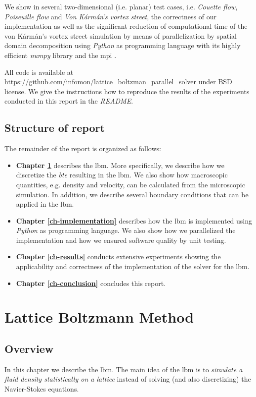 \documentclass[a4paper,11pt, footsepline]{book}
\begin{document}
We show in several two-dimensional (i.e. planar) test cases, i.e. \textit{Couette flow}, \textit{Poiseuille flow} and \textit{Von K\'{a}rm\'{a}n's vortex street}, the correctness of our implementation as well as the significant reduction of computational time of the von K\'{a}rm\'{a}n's vortex street simulation by means of parallelization by spatial domain decomposition using \textit{Python} as programming language with its highly efficient \textit{numpy} library \cite{Oliphant.2006,vanderWalt.2011} and the \acf{mpi} \cite{Dalcin.2005, Dalcin.2008, Dalcin.2011}.

All code is available at \url{https://github.com/infomon/lattice_boltzman_parallel_solver} under BSD license. We give the instructions how to reproduce the results of the experiments conducted in this report in the \textit{README}.

\section*{Structure of report}
The remainder of the report is organized as follows:
\begin{itemize}
\item \textbf{Chapter \ref{ch-method}} describes the \ac{lbm}. More specifically, we describe how we discretize the \textit{\acf{bte}} resulting in the \ac{lbm}. We also show how macroscopic quantities, e.g. density and velocity, can be calculated from the microscopic simulation. In addition, we describe several boundary conditions that can be applied in the \ac{lbm}.
\item \textbf{Chapter \ref{ch-implementation}} describes how the \ac{lbm} is implemented using \textit{Python} as programming language. We also show how we parallelized the implementation and how we ensured software quality by unit testing.
\item \textbf{Chapter \ref{ch-results}} conducts extensive experiments showing the applicability and correctness of the implementation of the solver for the \ac{lbm}. 
\item \textbf{Chapter \ref{ch-conclusion}} concludes this report.
\end{itemize}
\chapter{Lattice Boltzmann Method}\label{ch-method}
\section{Overview}
In this chapter we describe the \acf{lbm}. The main idea of the \ac{lbm} is to \textit{simulate a fluid density statistically on a lattice} instead of solving (and also discretizing) the Navier-Stokes equations.
\end{document}
